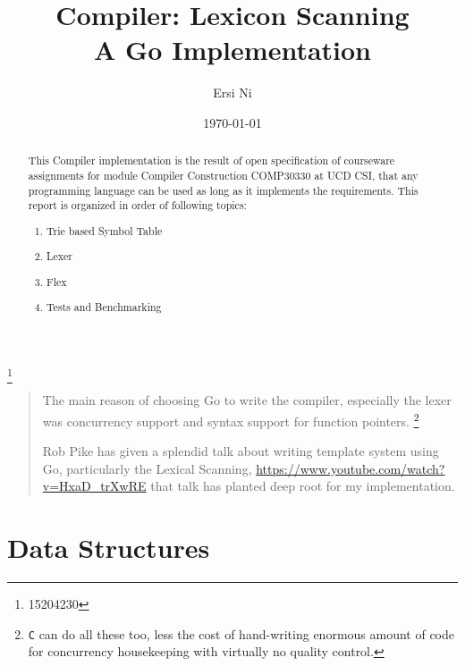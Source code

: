 \documentclass[%
 aip,
 jmp,%
 amsmath,amssymb,
 reprint,%
]{revtex4-1}
\begin{document}

\title[Lexicon Scanning for Compiler, a Computer Construction assignment report]{Compiler: Lexicon Scanning\\
A Go Implementation}%

\author{Ersi Ni}\thanks{15204230}


\date{\today}%

\begin{abstract}
This Compiler implementation is the result of open specification of courseware assignments for module Compiler Construction COMP30330 at UCD CSI, that any programming language can be used as long as it implements the requirements. This report is organized in order of following topics:
\begin{enumerate}[$\bullet$]
	\item Trie based Symbol Table 
	\item Lexer
	\item Flex
	\item Tests and Benchmarking
\end{enumerate}
\end{abstract}

\maketitle

\begin{quotation}
The main reason of choosing Go to write the compiler, especially the lexer was
concurrency support and syntax support for function pointers.   \footnote{\texttt{C} can do all these too, less the cost of hand-writing enormous amount of code for concurrency housekeeping with virtually no quality control.}

Rob Pike has given a splendid talk about writing template system using Go,
particularly the Lexical Scanning, \url{https://www.youtube.com/watch?v=HxaD_trXwRE}
that talk has planted deep root for my implementation.
\end{quotation}

\section{Data Structures}
\end{document}
